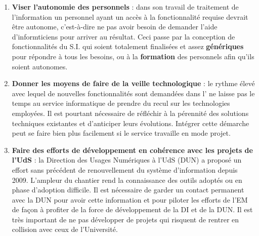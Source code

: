 \documentclass{book}
\begin{document}
\begin{enumerate}
\item \textbf{Viser l'autonomie des personnels} : dans son travail de traitement de
l'information un personnel ayant un accès à la fonctionnalité requise devrait être 
autonome, c'est-à-dire ne pas avoir besoin de demander l'aide d'informticiens 
pour arriver au résultat. Ceci passe par la conception de fonctionnalités du S.I. qui
soient totalement finalisées et assez \textbf{génériques} pour répondre à tous les besoins,
ou à la \textbf{formation} des personnels afin qu'ils soient autonomes.


\item \textbf{Donner les moyens de faire de la veille technologique} : le rythme
élevé avec lequel de nouvelles fonctionnalités sont demandées dans l'
ne laisse pas le temps au service informatique de prendre du recul sur les technologies
employées. Il est pourtant nécessaire de réfléchir à la pérennité des solutions techniques
existantes et d'anticiper leurs évolutions. Intégrer cette démarche peut se faire
bien plus facilement si le service travaille en mode projet.\\


\item \textbf{Faire des efforts de développement en cohérence avec les projets de l'UdS} : 
la Direction des Usages Numériques à l'UdS (DUN) a proposé un effort sans précédent de renouvellement
du système d'information depuis 2009. L'ampleur du chantier rend la connaissance des
outils adoptés ou en phase d'adoption difficile. Il est nécessaire de garder un contact
permanent avec la DUN pour avoir cette information et pour piloter les efforts de 
l'EM de façon à profiter de la force de développement de la DI et de la DUN.
Il est très important de ne pas développer de projets qui risquent de rentrer en 
collision avec ceux de l'Université. 


\end{enumerate}


%	





\appendix
\end{document}
